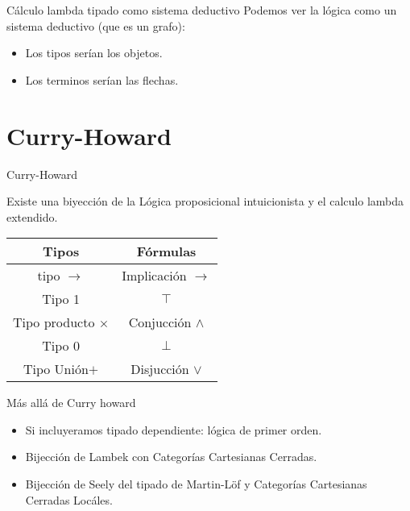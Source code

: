 \documentclass[usenames,dvipsnames]{beamer}
\begin{document}
\begin{frame}{Cálculo lambda tipado como sistema deductivo}
  Podemos ver la lógica como un sistema deductivo (que es un grafo):
  \begin{itemize}
  \item Los tipos serían los objetos.
  \item Los terminos serían las flechas.
  \end{itemize}  
\end{frame}

\section{Curry-Howard}

\begin{frame}{Curry-Howard}

  Existe una biyección de la Lógica proposicional intuicionista y el calculo lambda extendido.
\begin{table}[!h]
\begin{center}
  \begin{tabular}{|c|c|}
  \hline
  Tipos  & Fórmulas  \\
  \hline
  tipo $\to$   & Implicación $\to$  \\
  \hline 
  Tipo 1 & $\top$ \\
  Tipo producto $\times$ & Conjucción $\land$ \\
  \hline
    Tipo 0 & $\bot$ \\
    Tipo Unión$+$     & Disjucción $\lor$ \\
  \hline
\end{tabular}
\end{center}
\end{table}
  
\end{frame}

\begin{frame}{Más allá de Curry howard}
  \begin{itemize}
  \item Si incluyeramos tipado dependiente: lógica de primer orden.
  \item Bijección de Lambek con Categorías Cartesianas Cerradas.
  \item Bijección de Seely del tipado de Martin-Löf y Categorías Cartesianas Cerradas Locáles. 
  \end{itemize}
\end{frame}
\end{document}

